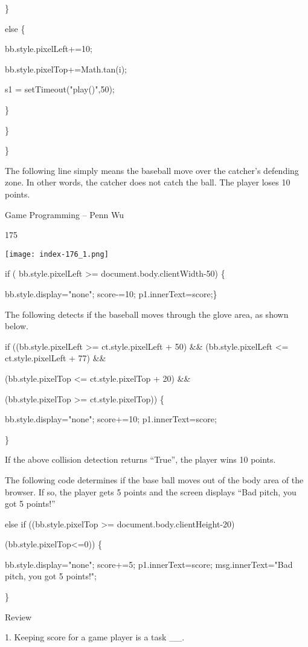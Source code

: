 \documentclass[
]{article}
\begin{document}
\}

else \{

bb.style.pixelLeft+=10;

bb.style.pixelTop+=Math.tan(i);

s1 = setTimeout("play()",50);

\}

\}

\}

The following line simply means the baseball move over the catcher's
defending zone. In other words, the catcher does not catch the ball. The
player loses 10 points.

Game Programming -- Penn Wu

175

\protect\hypertarget{index_split_011.htmlux5cux23p176}{}{}\texttt{[image: index-176\_1.png]}

if ( bb.style.pixelLeft \textgreater= document.body.clientWidth-50) \{

bb.style.display="none"; score-=10; p1.innerText=score;\}

The following detects if the baseball moves through the glove area, as
shown below.

if ((bb.style.pixelLeft \textgreater= ct.style.pixelLeft + 50) \&\&
(bb.style.pixelLeft \textless= ct.style.pixelLeft + 77) \&\&

(bb.style.pixelTop \textless= ct.style.pixelTop + 20) \&\&

(bb.style.pixelTop \textgreater= ct.style.pixelTop)) \{

bb.style.display="none"; score+=10; p1.innerText=score;

\}

If the above collision detection returns ``True'', the player wins 10
points.

The following code determines if the base ball moves out of the body
area of the browser. If so, the player gets 5 points and the screen
displays ``Bad pitch, you got 5 points!''

else if ((bb.style.pixelTop \textgreater= document.body.clientHeight-20)
\textbar\textbar{}

(bb.style.pixelTop\textless=0)) \{

bb.style.display="none"; score+=5; p1.innerText=score;
msg.innerText="Bad pitch, you got 5 points!";

\}

Review

1. Keeping score for a game player is a task \_\_.
\end{document}
